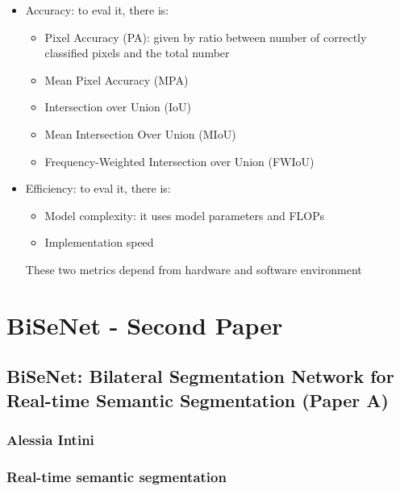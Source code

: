 \documentclass{article}
\begin{document}
        \begin{itemize}
            \item Accuracy: to eval it, there is:
            \begin{itemize}
                \item Pixel Accuracy (PA): given by ratio between number of correctly
                    classified pixels and the total number
                \item Mean Pixel Accuracy (MPA)
                \item Intersection over Union (IoU)
                \item Mean Intersection Over Union (MIoU)
                \item Frequency-Weighted Intersection over Union (FWIoU)
            \end{itemize}
            \item Efficiency: to eval it, there is:
            \begin{itemize}
                \item Model complexity: it uses model parameters and FLOPs
                \item Implementation speed
            \end{itemize}
            These two metrics depend from hardware and software environment
        \end{itemize}

    \section{BiSeNet - Second Paper}
        \subsection{BiSeNet: Bilateral Segmentation Network for Real-time Semantic Segmentation (Paper A)}    
            \subsubsection{Alessia Intini}
            \subsubsection{Real-time semantic segmentation}
\end{document}
